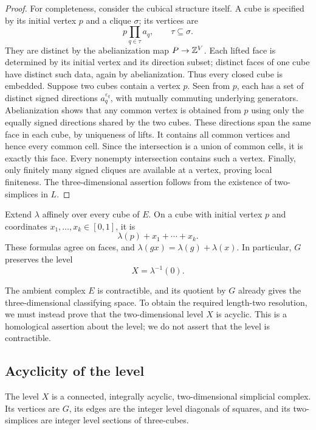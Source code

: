 \begin{proof}
For completeness, consider the cubical structure itself.  A cube
is specified by its initial vertex $p$ and a clique $\sigma$; its
vertices are
\[
 p\prod_{q\in\tau}a_q,\qquad \tau\subseteq\sigma.
\]
They are distinct by the abelianization map
$P\to\mathbb Z^V$.  Each lifted face is determined by its initial vertex
and its direction subset; distinct faces of one cube have distinct
such data, again by abelianization.  Thus every closed cube is
embedded.  Suppose two cubes contain a vertex $p$.  Seen from $p$,
each has a set of distinct signed directions $a_q^{\varepsilon_q}$,
with mutually commuting underlying generators.  Abelianization
shows that any common vertex is obtained from $p$ using only the
equally signed directions shared by the two cubes.  These directions
span the same face in each cube, by uniqueness of lifts.  It contains
all common vertices and hence every common cell.  Since the
intersection is a union of common cells, it is exactly this face.
Every nonempty intersection contains such a vertex.  Finally, only
finitely many signed cliques are available at a vertex, proving
local finiteness.  The three-dimensional assertion follows from
the existence of two-simplices in $L$.
\end{proof}

Extend $\lambda$ affinely over every cube of $E$.  On a cube with
initial vertex $p$ and coordinates $x_1,\ldots,x_k\in[0,1]$, it is
\begin{equation}\label{eq:affine-height}
 \lambda(p)+x_1+\cdots+x_k.
\end{equation}
These formulas agree on faces, and
$\lambda(gx)=\lambda(g)+\lambda(x)$.  In particular, $G$ preserves
the level
\begin{equation}\label{eq:zero-level}
 X=\lambda^{-1}(0).
\end{equation}

The ambient complex $E$ is contractible, and its quotient by $G$ already
gives the three-dimensional classifying space. To obtain the required
length-two resolution, we must instead prove that the two-dimensional
level $X$ is acyclic. This is a homological assertion about the level;
we do not assert that the level is contractible.

\subsection{Acyclicity of the level}

\begin{lemma}\label{lem:acyclic-level}
The level $X$ is a connected, integrally acyclic, two-dimensional
simplicial complex.  Its vertices are $G$, its edges are the integer
level diagonals of squares, and its two-simplices are integer level
sections of three-cubes.
\end{lemma}

